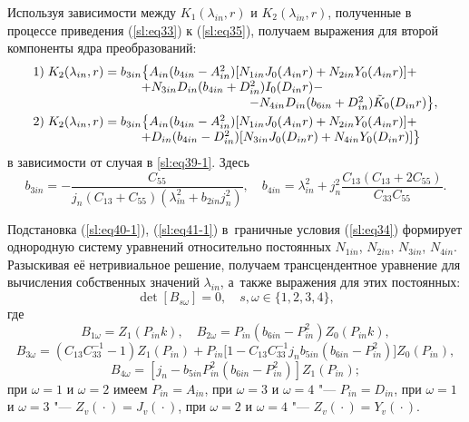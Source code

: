 Используя зависимости между $K_1 (\lambda_{in}, r)$ и $K_2 
(\lambda_{in}, r)$, полученные в процессе приведения (\ref{sl:eq33}) 
к (\ref{sl:eq35}), получаем выражения для второй компоненты ядра преобразований:
\begin{equation}
\label{sl:eq41-1}
\begin{array}{l}
1) \; K_2 (\lambda_{in}, r)=b_{3in} \bigl\{ A_{in} (b_{4in} -A_{in}^2 ) [ N_{1in} J_0 (A_{in} r)+
N_{2in} Y_0 (A_{in} r)]+
\\
\hspace{3cm} 
+N_{3in} D_{in} (b_{4in} +D_{in}^2)I_0(D_{in} r)- \\
\hspace{3cm} \hspace{3cm} - N_{4in} D_{in} (b_{6in} +D_{in}^2)\tilde {K}_0 (D_{in} r) \bigr\}, \vspace{1mm}  \\
2)\; K_2 (\lambda_{in}, r)=b_{3in} \bigl\{ A_{in} (b_{4in} -A_{in}^2 ) [N_{1in} J_0 (A_{in} r )+
N_{2in} Y_0 (A_{in} r)]+
\\
\hspace{3cm} 
+D_{in} (b_{4in} -D_{in}^2 )[N_{3in} J_0 ( D_{in} r)+N_{4in} Y_0 (D_{in} r) ]\bigr\}
\end{array}
\end{equation}
в зависимости от случая в \eqref{sl:eq39-1}. Здесь
\[
b_{3in} =-\frac{C_{55} }{j_n (C_{13} +C_{55} )(\lambda _{in}^2 +b_{2in} j_n^2 )}, 
\quad
b_{4in} =\lambda _{in}^2 +j_n^2 \frac{C_{13} (C_{13} +2C_{55} )}{C_{33} C_{55} }.
\]

Подстановка (\ref{sl:eq40-1}), (\ref{sl:eq41-1}) в~граничные условия (\ref{sl:eq34}) формирует однородную систему уравнений относительно постоянных $N_{1in}$, $N_{2in}$, $N_{3in}$, $N_{4in}$. 
Разыскивая её нетривиальное решение, получаем трансцендентное уравнение для вычисления собственных значений $\lambda _{in}$, а~также выражения для этих
постоянных:
\begin{equation}
\label{sl:eq38}
\det [ B_{s\omega }]=0, \quad  s, \omega\in \{1, 2, 3, 4 \},
\end{equation}
где
\[
B_{1\omega }=Z_1 (P_{in} k), \quad B_{2\omega } =P_{in} (b_{6in} -P_{in}^2 )Z_0 (P_{in} k), 
\]
\[
B_{3\omega } =(C_{13} C_{33}^{-1} -1)Z_1 (P_{in} )+ P_{in} \bigl[1-C_{13} C_{33}^{-1} j_n b_{5in} (b_{6in} -P_{in}^2 )\bigr] Z_0 (P_{in} ), 
\]
\[
B_{4\omega } =\left[ {j_n -b_{5in} P_{in}^2 \left( {b_{6in} -P_{in}^2 } 
\right)} \right]Z_1 \left( {P_{in} } \right);
\]
при $\omega =1$ и $\omega= 2$ имеем $P_{in} =A_{in}$, 
при $\omega =3$ и $\omega= 4$ "--- $P_{in} =D_{in}$, 
при $\omega =1$ и $\omega= 3$ "--- $Z_v ( {} \cdot {} )=J_v ( {} \cdot {} )$, 
при $\omega =2$ и $\omega= 4$ "--- $Z_v ( {} \cdot {} )=Y_v ( {} \cdot {} )$.

